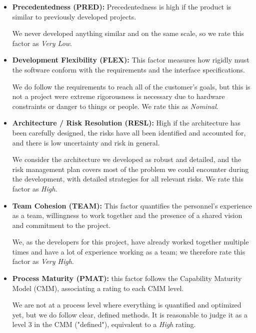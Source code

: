 \documentclass[english]{article}
\begin{document}
\begin{itemize}
	\item \textbf{Precedentedness (PRED):} 
	Precedentedness is high if the product is similar to previously developed projects.
	
	We never developed anything similar and on the same scale, so we rate this factor as \textit{Very Low}.
	
	\item \textbf{Development Flexibility (FLEX):} 	
	This factor measures how rigidly must the software conform with the requirements and the interface specifications.
	
	We do follow the requirements to reach all of the customer's goals, but this is not a project were extreme rigorousness is necessary due to hardware constraints or danger to things or people. We rate this as \textit{Nominal}.
	
	\item \textbf{Architecture / Risk Resolution (RESL):} High if the architecture has been carefully designed, the risks have all been identified and accounted for, and there is low uncertainty and risk in general.
	
	We consider the architecture we developed as robust and detailed, and the risk management plan covers most of the problem we could encounter during the development, with detailed strategies for all relevant risks. We rate this factor as \textit{High}.
	
	\item \textbf{Team Cohesion (TEAM):} 
	This factor quantifies the personnel's experience as a team, willingness to work together and the presence of a shared vision and commitment to the project.
	
	We, as the developers for this project, have already worked together multiple times and have a lot of experience working as a team; we therefore rate this factor as \textit{Very High}.
	
	\item \textbf{Process Maturity (PMAT):} this factor follows the Capability Maturity Model (CMM), associating a rating to each CMM level. 
	
	We are not at a process level where everything is quantified and optimized yet, but we do follow clear, defined methods. It is reasonable to judge it as a level 3 in the CMM ("defined"), equivalent to a \textit{High} rating.
\end{itemize}
\end{document}

